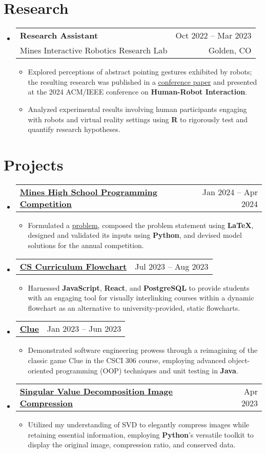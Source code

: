\documentclass[letterpaper,11pt]{article}
\makeatletter
\newcommand{\resumeItem}[1]{
  \item\small{
    {#1 \vspace{-2pt}}
  }
}
\newcommand{\resumeSubheading}[4]{
  \vspace{-2pt}\item
    \begin{tabular*}{0.97\textwidth}[t]{l@{\extracolsep{\fill}}r}
      \textbf{#1} & {\small #2} \\
      {\small #3} & {\small #4} \\
    \end{tabular*}\vspace{-7pt}
}
\newcommand{\resumeProjectHeading}[2]{
    \item
    \begin{tabular*}{0.97\textwidth}{l@{\extracolsep{\fill}}r}
      \small{\textbf{#1}} & \small{#2} \\
    \end{tabular*}\vspace{-7pt}
}
\newcommand{\resumeSubHeadingListStart}{\begin{itemize}[leftmargin=0.15in, label={}]}
\newcommand{\resumeSubHeadingListEnd}{\end{itemize}}
\newcommand{\resumeItemListStart}{\begin{itemize}}
\newcommand{\resumeItemListEnd}{\end{itemize}\vspace{-5pt}}
\makeatother
\begin{document}
\section{Research}
    \resumeSubHeadingListStart
      \resumeSubheading
      {Research Assistant}{Oct 2022 -- Mar 2023}
      {Mines Interactive Robotics Research Lab}{Golden, CO}
          \resumeItemListStart
            \resumeItem{Explored perceptions of abstract pointing gestures exhibited by robots; the resulting research was published in a \underline{\href{https://doi.org/10.1145/3610977.3634924}{conference paper}} and presented at the 2024 ACM/IEEE conference on \textbf{Human-Robot Interaction}.}\
            \resumeItem{Analyzed experimental results involving human participants engaging with robots and virtual reality settings using \textbf{R} to rigorously test and quantify research hypotheses.}
          \resumeItemListEnd
    \resumeSubHeadingListEnd
  
\section{Projects}
    \resumeSubHeadingListStart
      \resumeProjectHeading
          {\underline{\href{https://keenanschott.com/portfolio/\#project-hspc}{Mines High School Programming Competition}}}{Jan 2024 -- Apr 2024}
          \resumeItemListStart
            \resumeItem{Formulated a \href{https://mines-hspc.kattis.com/contests/mines-hspc24/problems/nostragglers}{\underline{problem}}, composed the problem statement using \textbf{\LaTeX}, designed and validated its inputs using \textbf{Python}, and devised model solutions for the annual competition.}
          \resumeItemListEnd
      \resumeProjectHeading
          {\underline{\href{https://keenanschott.com/portfolio/\#project-cs-curriculum-flowchart}{CS Curriculum Flowchart}}}{Jul 2023 -- Aug 2023}
          \resumeItemListStart
            \resumeItem{Harnessed \textbf{JavaScript}, \textbf{React}, and \textbf{PostgreSQL} to provide students with an engaging tool for visually interlinking courses within a dynamic flowchart as an alternative to university-provided, static flowcharts.}
          \resumeItemListEnd
      \resumeProjectHeading
          {\underline{\href{https://keenanschott.com/portfolio/\#project-clue}{Clue}}}{Jan 2023 -- Jun 2023}
          \resumeItemListStart
            \resumeItem{Demonstrated software engineering prowess through a reimagining of the classic game Clue in the CSCI 306 course, employing advanced object-oriented programming (OOP) techniques and unit testing in \textbf{Java}.}
          \resumeItemListEnd
      \resumeProjectHeading
          {\underline{\href{https://keenanschott.com/portfolio/\#project-svd}{Singular Value Decomposition Image Compression}}}{Apr 2023}
          \resumeItemListStart
            \resumeItem{Utilized my understanding of SVD to elegantly compress images while retaining essential information, employing \textbf{Python}'s versatile toolkit to display the original image, compression ratio, and conserved data.}
          \resumeItemListEnd
    \resumeSubHeadingListEnd
\end{document}
